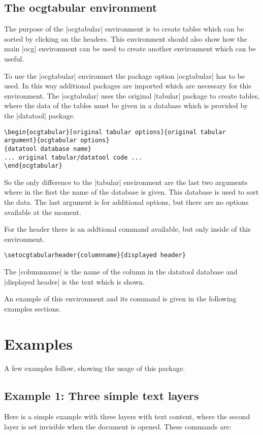 \documentclass[a4paper]{ltxdoc}
\begin{document}
\subsection{The ocgtabular environment}
The purpose of the |ocgtabular| environment is to create tables which can be sorted by clicking on the headers. This environment should also show how the main |ocg| environment can be used to create another environment which can be useful.

To use the |ocgtabular| environmet the package option |ocgtabular| has to be used. In this way additional packages are imported which are necessary for this environment. The |ocgtabular| uses the original |tabular| package to create tables, where the data of the tables must be given in a database which is provided by the |datatool| package.

\begin{verbatim}
\begin{ocgtabular}[original tabular options]{original tabular argument}{ocgtabular options}
{datatool database name}
... original tabular/datatool code ...
\end{ocgtabular}
 \end{verbatim}

So the only difference to the |tabular| environment are the last two arguments where in the first the name of the database is given. This database is used to sort the data. The last argument is for additional options, but there are no options available at the moment.

For the header there is an addtional command available, but only inside of this environment.

\begin{verbatim}
\setocgtabularheader{columnname}{displayed header}
 \end{verbatim}

The |columnname| is the name of the column in the datatool database and |displayed header| is the text which is shown.

 An example of this environment and its command is given in the following examples sections.

\newpage
\section{Examples}
A few examples follow, showing the usage of this package.

\subsection{Example 1: Three simple text layers}
Here is a simple example with three layers with text content, where the second layer is set invisible when the document is opened. These commands are:
\end{document}
